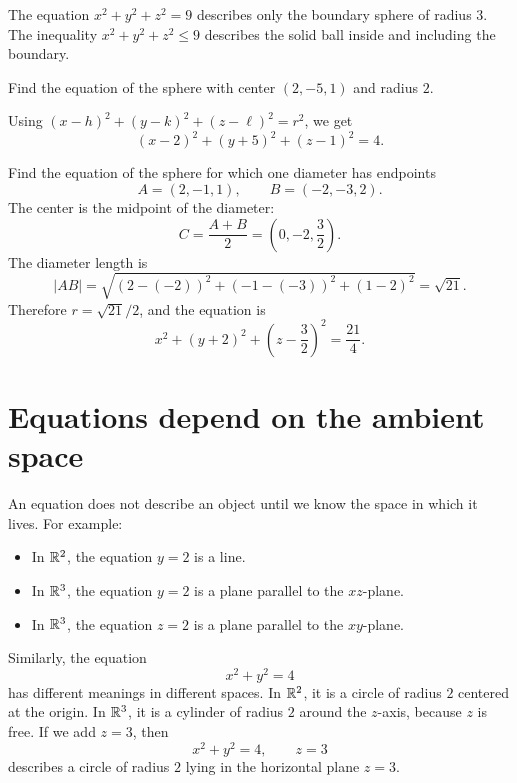 \begin{notebox}[title={Boundary versus region}]
The equation $x^2+y^2+z^2=9$ describes only the boundary sphere of radius $3$. The inequality $x^2+y^2+z^2\le 9$ describes the solid ball inside and including the boundary.
\end{notebox}

\begin{examplebox}[title={Worked example: equation of a sphere}]
Find the equation of the sphere with center $(2,-5,1)$ and radius $2$.

Using $(x-h)^2+(y-k)^2+(z-\ell)^2=r^2$, we get
\[
  (x-2)^2+(y+5)^2+(z-1)^2=4.
\]
\end{examplebox}

\begin{examplebox}[title={Worked example: diameter endpoints}]
Find the equation of the sphere for which one diameter has endpoints
\[
  A=(2,-1,1),\qquad B=(-2,-3,2).
\]
The center is the midpoint of the diameter:
\[
  C=\frac{A+B}{2}=\left(0,-2,\frac32\right).
\]
The diameter length is
\[
  |AB|=\sqrt{(2-(-2))^2+(-1-(-3))^2+(1-2)^2}=\sqrt{21}.
\]
Therefore $r=\sqrt{21}/2$, and the equation is
\[
  x^2+(y+2)^2+\left(z-\frac32\right)^2=\frac{21}{4}.
\]
\end{examplebox}

\section{Equations depend on the ambient space}

An equation does not describe an object until we know the space in which it lives. For example:
\begin{itemize}
  \item In $\mathbb{R}^2$, the equation $y=2$ is a line.
  \item In $\mathbb{R}^3$, the equation $y=2$ is a plane parallel to the $xz$-plane.
  \item In $\mathbb{R}^3$, the equation $z=2$ is a plane parallel to the $xy$-plane.
\end{itemize}

Similarly, the equation
\[
  x^2+y^2=4
\]
has different meanings in different spaces. In $\mathbb{R}^2$, it is a circle of radius $2$ centered at the origin. In $\mathbb{R}^3$, it is a cylinder of radius $2$ around the $z$-axis, because $z$ is free. If we add $z=3$, then
\[
  x^2+y^2=4,\qquad z=3
\]
describes a circle of radius $2$ lying in the horizontal plane $z=3$.

